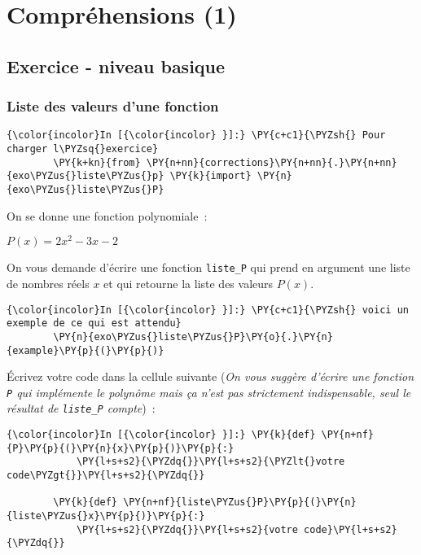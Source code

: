     \hypertarget{compruxe9hensions-1}{%
\section{Compréhensions (1)}\label{compruxe9hensions-1}}

    \hypertarget{exercice---niveau-basique}{%
\subsection{Exercice - niveau basique}\label{exercice---niveau-basique}}

    \hypertarget{liste-des-valeurs-dune-fonction}{%
\subsubsection{Liste des valeurs d'une
fonction}\label{liste-des-valeurs-dune-fonction}}

    \begin{Verbatim}[commandchars=\\\{\}]
{\color{incolor}In [{\color{incolor} }]:} \PY{c+c1}{\PYZsh{} Pour charger l\PYZsq{}exercice}
        \PY{k+kn}{from} \PY{n+nn}{corrections}\PY{n+nn}{.}\PY{n+nn}{exo\PYZus{}liste\PYZus{}p} \PY{k}{import} \PY{n}{exo\PYZus{}liste\PYZus{}P}
\end{Verbatim}


    On se donne une fonction polynomiale~:

\(P(x) = 2x^2 - 3x - 2\)

    On vous demande d'écrire une fonction \texttt{liste\_P} qui prend en
argument une liste de nombres réels \(x\) et qui retourne la liste des
valeurs \(P(x)\).

    \begin{Verbatim}[commandchars=\\\{\}]
{\color{incolor}In [{\color{incolor} }]:} \PY{c+c1}{\PYZsh{} voici un exemple de ce qui est attendu}
        \PY{n}{exo\PYZus{}liste\PYZus{}P}\PY{o}{.}\PY{n}{example}\PY{p}{(}\PY{p}{)}
\end{Verbatim}


    Écrivez votre code dans la cellule suivante (\emph{On vous suggère
d'écrire une fonction \texttt{P} qui implémente le polynôme mais ça
n'est pas strictement indispensable, seul le résultat de
\texttt{liste\_P} compte})~:

    \begin{Verbatim}[commandchars=\\\{\}]
{\color{incolor}In [{\color{incolor} }]:} \PY{k}{def} \PY{n+nf}{P}\PY{p}{(}\PY{n}{x}\PY{p}{)}\PY{p}{:}
            \PY{l+s+s2}{\PYZdq{}}\PY{l+s+s2}{\PYZlt{}votre code\PYZgt{}}\PY{l+s+s2}{\PYZdq{}}
        
        \PY{k}{def} \PY{n+nf}{liste\PYZus{}P}\PY{p}{(}\PY{n}{liste\PYZus{}x}\PY{p}{)}\PY{p}{:}
            \PY{l+s+s2}{\PYZdq{}}\PY{l+s+s2}{votre code}\PY{l+s+s2}{\PYZdq{}}
\end{Verbatim}


